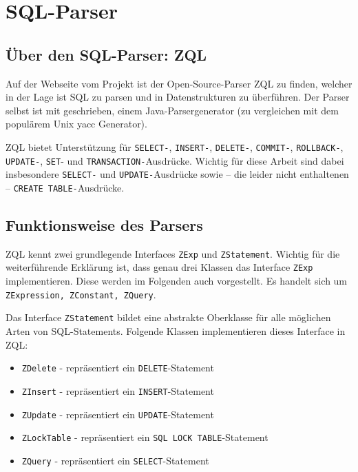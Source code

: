 \section{SQL-Parser}

\subsection{Über den SQL-Parser: ZQL}

	Auf der Webseite vom \cite{zql1} Projekt ist der Open-Source-Parser ZQL zu finden, welcher in der Lage ist SQL zu parsen und in Datenstrukturen zu überführen. Der Parser selbst ist mit \cite{javacc1} geschrieben, einem  Java-Parsergenerator (zu vergleichen mit dem populärem Unix yacc Generator).

ZQL bietet Unterstützung für \verb|SELECT-|, \verb|INSERT-|, \verb|DELETE-|, \verb|COMMIT-|, \verb|ROLLBACK-|, \verb|UPDATE-|, \verb|SET|- und \verb|TRANSACTION-|Ausdrücke. Wichtig für diese Arbeit sind dabei insbesondere \verb|SELECT-| und \verb|UPDATE-|Ausdrücke sowie -- die leider nicht enthaltenen -- \verb|CREATE TABLE-|Ausdrücke.

\subsection{Funktionsweise des Parsers}
\label{subsec:funktionparser}

ZQL kennt zwei grundlegende Interfaces \verb|ZExp| und \verb|ZStatement|. Wichtig für die weiterführende Erklärung ist, dass genau drei Klassen das Interface \verb|ZExp| implementieren. Diese werden im Folgenden auch vorgestellt. Es handelt sich um \verb|ZExpression, ZConstant, ZQuery|.

Das Interface \verb|ZStatement| bildet eine abstrakte Oberklasse für alle möglichen Arten von SQL-Statements. Folgende Klassen implementieren dieses Interface in ZQL:

\begin{itemize}
\item \verb|ZDelete| - repräsentiert ein \verb|DELETE|-Statement
\item \verb|ZInsert| - repräsentiert ein \verb|INSERT|-Statement
\item \verb|ZUpdate| - repräsentiert ein \verb|UPDATE|-Statement
\item \verb|ZLockTable| - repräsentiert ein \verb|SQL LOCK TABLE|-Statement
\item \verb|ZQuery| - repräsentiert ein \verb|SELECT|-Statement
\end{itemize}


